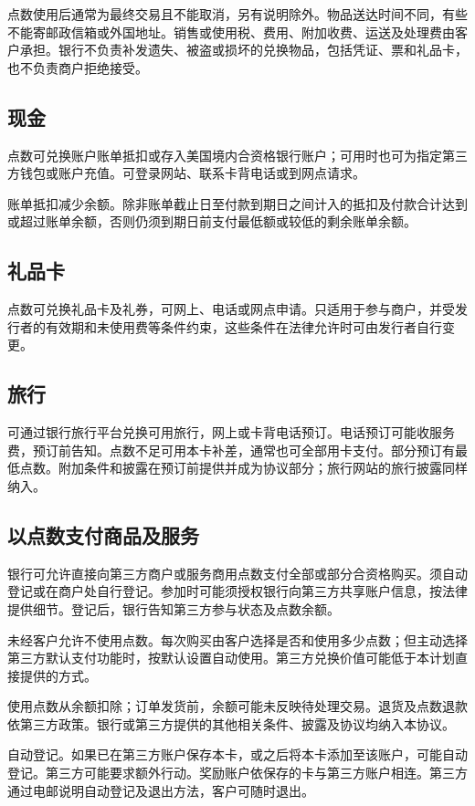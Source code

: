 \documentclass[UTF8,fontset=none,11pt,a4paper]{ctexart}
\begin{document}
点数使用后通常为最终交易且不能取消，另有说明除外。物品送达时间不同，有些不能寄邮政信箱或外国地址。销售或使用税、费用、附加收费、运送及处理费由客户承担。银行不负责补发遗失、被盗或损坏的兑换物品，包括凭证、票和礼品卡，也不负责商户拒绝接受。


\subsection*{现金}
点数可兑换账户账单抵扣或存入美国境内合资格银行账户；可用时也可为指定第三方钱包或账户充值。可登录网站、联系卡背电话或到网点请求。


账单抵扣减少余额。除非账单截止日至付款到期日之间计入的抵扣及付款合计达到或超过账单余额，否则仍须到期日前支付最低额或较低的剩余账单余额。


\subsection*{礼品卡}
点数可兑换礼品卡及礼券，可网上、电话或网点申请。只适用于参与商户，并受发行者的有效期和未使用费等条件约束，这些条件在法律允许时可由发行者自行变更。


\subsection*{旅行}
可通过银行旅行平台兑换可用旅行，网上或卡背电话预订。电话预订可能收服务费，预订前告知。点数不足可用本卡补差，通常也可全部用卡支付。部分预订有最低点数。附加条件和披露在预订前提供并成为协议部分；旅行网站的旅行披露同样纳入。


\subsection*{以点数支付商品及服务}
银行可允许直接向第三方商户或服务商用点数支付全部或部分合资格购买。须自动登记或在商户处自行登记。参加时可能须授权银行向第三方共享账户信息，按法律提供细节。登记后，银行告知第三方参与状态及点数余额。


未经客户允许不使用点数。每次购买由客户选择是否和使用多少点数；但主动选择第三方默认支付功能时，按默认设置自动使用。第三方兑换价值可能低于本计划直接提供的方式。


使用点数从余额扣除；订单发货前，余额可能未反映待处理交易。退货及点数退款依第三方政策。银行或第三方提供的其他相关条件、披露及协议均纳入本协议。


自动登记。如果已在第三方账户保存本卡，或之后将本卡添加至该账户，可能自动登记。第三方可能要求额外行动。奖励账户依保存的卡与第三方账户相连。第三方通过电邮说明自动登记及退出方法，客户可随时退出。
\end{document}
